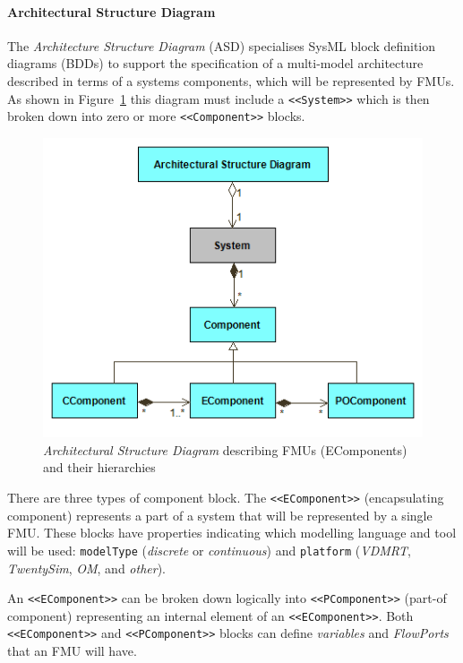 \newpage
\paragraph{Architectural Structure Diagram}
\label{sec:sysml:intocps:asd}

The \emph{Architecture Structure Diagram} (ASD) specialises SysML block definition diagrams (BDDs) to support the specification of a multi-model architecture described in terms of a systems components, which will be represented by FMUs. As shown in Figure~\ref{fig:sysml:sysml:intocps:ase} this diagram must include a \texttt{<<System>>} which is then broken down into zero or more \texttt{<<Component>>} blocks.

\begin{figure}[h!]
\centering
\includegraphics[scale=0.6]{figures/Architecting/ArchitecturalStructureElements}
\caption{\emph{Architectural Structure Diagram} describing FMUs (EComponents) and their hierarchies}
\label{fig:sysml:sysml:intocps:ase}
\end{figure}

There are three types of component block. The \texttt{<<EComponent>>} (encapsulating component) represents a part of a system that will be represented by a single FMU. These blocks have properties indicating which modelling language and tool will be used: \texttt{modelType} (\emph{discrete} or \emph{continuous}) and \texttt{platform} (\emph{VDMRT}, \emph{TwentySim}, \emph{OM}, and \emph{other}).

An \texttt{<<EComponent>>} can be broken down logically into \texttt{<<PComponent>>} (part-of component) representing an internal element of an \texttt{<<EComponent>>}. Both \texttt{<<EComponent>>} and \texttt{<<PComponent>>} blocks can define \emph{variables} and \emph{FlowPorts} that an FMU will have.

